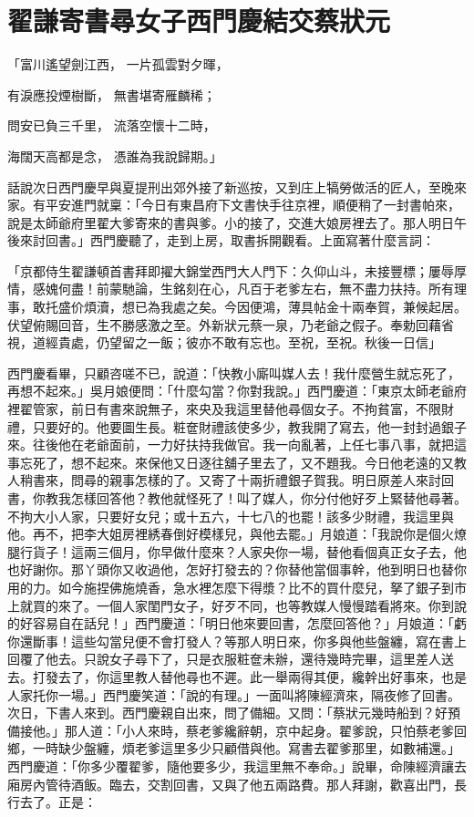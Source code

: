 %

\chapter{翟謙寄書尋女子\KG 西門慶結交蔡狀元}



「富川遙望劍江西，  一片孤雲對夕暉，

有淚應投煙樹斷，  無書堪寄雁麟稀；

問安已負三千里，  流落空懷十二時，

海闊天高都是念，  憑誰為我說歸期。」

話說次日西門慶早與夏提刑出郊外接了新巡按，又到庄上犒勞做活的匠人，至晚來家。有平安進門就稟：「今日有東昌府下文書快手往京裡，順便稍了一封書帕來，說是太師爺府里翟大爹寄來的書與爹。小的接了，交進大娘房裡去了。那人明日午後來討回書。」西門慶聽了，走到上房，取書拆開觀看。上面寫著什麼言詞：

「京都侍生翟謙頓首書拜即擢大錦堂西門大人門下：久仰山斗，未接豐標；屢辱厚情，感媿何盡！前蒙馳論，生銘刻在心，凡百于老爹左右，無不盡力扶持。所有理事，敢托盛价煩瀆，想已為我處之矣。今因便鴻，薄具帖金十兩奉賀，兼候起居。伏望俯賜回音，生不勝感激之至。外新狀元蔡一泉，乃老爺之假子。奉勅回藉省視，道經貴處，仍望留之一飯；彼亦不敢有忘也。至祝，至祝。秋後一日信」

西門慶看畢，只顧咨嗟不已，說道：「快教小廝叫媒人去！我什麼營生就忘死了，再想不起來。」吳月娘便問：「什麼勾當？你對我說。」西門慶道：「東京太師老爺府裡翟管家，前日有書來說無子，來央及我這里替他尋個女子。不拘貧富，不限財禮，只要好的。他要圖生長。粧奩財禮該使多少，教我開了寫去，他一封封過銀子來。往後他在老爺面前，一力好扶持我做官。我一向亂著，上任七事八事，就把這事忘死了，想不起來。來保他又日逐往舖子里去了，又不題我。今日他老遠的又教人稍書來，問尋的親事怎樣的了。又寄了十兩折禮銀子賀我。明日原差人來討回書，你教我怎樣回答他？教他就怪死了！叫了媒人，你分付他好歹上緊替他尋著。不拘大小人家，只要好女兒；或十五六，十七八的也罷！該多少財禮，我這里與他。再不，把李大姐房裡綉春倒好模樣兒，與他去罷。」月娘道：「我說你是個火燎腿行貨子！這兩三個月，你早做什麼來？人家央你一場，替他看個真正女子去，他也好謝你。那丫頭你又收過他，怎好打發去的？你替他當個事幹，他到明日也替你用的力。如今施捏佛施燒香，急水裡怎麼下得漿？比不的買什麼兒，拏了銀子到市上就買的來了。一個人家閨門女子，好歹不同，也等教媒人慢慢踏看將來。你到說的好容易自在話兒！」西門慶道：「明日他來要回書，怎麼回答他？」月娘道：「虧你還斷事！這些勾當兒便不會打發人？等那人明日來，你多與他些盤纏，寫在書上回覆了他去。只說女子尋下了，只是衣服粧奩未辦，還待幾時完畢，這里差人送去。打發去了，你這里教人替他尋也不遲。此一舉兩得其便，纔幹出好事來，也是人家托你一場。」西門慶笑道：「說的有理。」一面叫將陳經濟來，隔夜修了回書。次日，下書人來到。西門慶親自出來，問了備細。又問：「蔡狀元幾時船到？好預備接他。」那人道：「小人來時，蔡老爹纔辭朝，京中起身。翟爹說，只怕蔡老爹回鄉，一時缺少盤纏，煩老爹這里多少只顧借與他。寫書去翟爹那里，如數補還。」西門慶道：「你多少覆翟爹，隨他要多少，我這里無不奉命。」說畢，命陳經濟讓去廂房內管待酒飯。臨去，交割回書，又與了他五兩路費。那人拜謝，歡喜出門，長行去了。正是：

